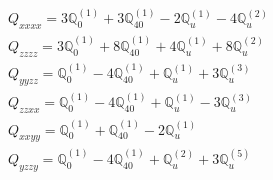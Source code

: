 \documentclass[fleqn,8pt,landscape]{jsarticle}
\begin{document}
\begin{align*}
& Q_{xxxx} = 3 \mathbb{Q}_{0}^{(1)} + 3 \mathbb{Q}_{40}^{(1)} - 2 \mathbb{Q}_{u}^{(1)} - 4 \mathbb{Q}_{u}^{(2)} \\
& Q_{zzzz} = 3 \mathbb{Q}_{0}^{(1)} + 8 \mathbb{Q}_{40}^{(1)} + 4 \mathbb{Q}_{u}^{(1)} + 8 \mathbb{Q}_{u}^{(2)} \\
& Q_{yyzz} = \mathbb{Q}_{0}^{(1)} - 4 \mathbb{Q}_{40}^{(1)} + \mathbb{Q}_{u}^{(1)} + 3 \mathbb{Q}_{u}^{(3)} \\
& Q_{zzxx} = \mathbb{Q}_{0}^{(1)} - 4 \mathbb{Q}_{40}^{(1)} + \mathbb{Q}_{u}^{(1)} - 3 \mathbb{Q}_{u}^{(3)} \\
& Q_{xxyy} = \mathbb{Q}_{0}^{(1)} + \mathbb{Q}_{40}^{(1)} - 2 \mathbb{Q}_{u}^{(1)} \\
& Q_{yzzy} = \mathbb{Q}_{0}^{(1)} - 4 \mathbb{Q}_{40}^{(1)} + \mathbb{Q}_{u}^{(2)} + 3 \mathbb{Q}_{u}^{(5)}
\end{align*}
\end{document}
